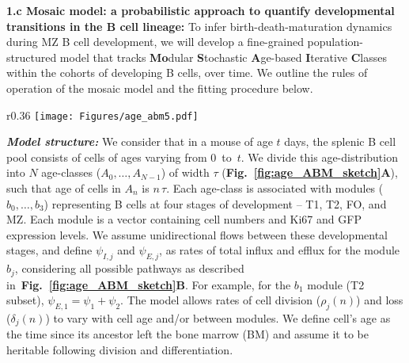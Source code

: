 \documentclass[11pt]{article}
\newcommand\ie{$\textit{i.e.}$}
\newcommand{\blue}[1]{{\color{blue}{#1}}}
\begin{document}
\textbf{{1.c Mosaic model: a probabilistic approach to quantify developmental transitions in the B cell lineage:}}
To infer birth-death-maturation dynamics during MZ B cell development, we will develop a fine-grained population-structured model that tracks \textbf{Mo}dular \textbf{S}tochastic \textbf{A}ge-based \textbf{I}terative \textbf{C}lasses within the cohorts of developing B cells, over time.
We outline the rules of operation of the mosaic model and the fitting procedure below.

\begin{wrapfigure}{r}{0.36\textwidth}
\centering
\vspace*{1mm}
\texttt{[image: Figures/age\_abm5.pdf]}
\vspace*{-6mm}
\caption{
\textbf{(A)}~Schematics of the mosaic model. %
\textbf{(B)}~Candidate pathways of B cell development.
}
\vspace*{-4mm}
\label{fig:age_ABM_sketch}
\end{wrapfigure}

\textbf{\textit{Model structure:}}
We consider that in a mouse of age $t$ days, the splenic B cell pool consists of cells of ages varying from $0$~to~$t$.
We divide this age-distribution into $N$ age-classes ($A_{0} ,\ldots, A_{N-1}$)  of width $\tau$ (\textbf{Fig.~\ref{fig:age_ABM_sketch}A}), such that age of cells in $A_{n}$ is $n \, \tau$. %
Each age-class is associated with modules ($b_{0} ,\ldots, b_{3}$) representing B cells at four stages of development -- T1, T2, FO, and MZ. Each module is a vector containing cell numbers and Ki67 and GFP expression levels. %
We assume unidirectional flows between these developmental stages, and define $\psi_{I, j}$ and $\psi_{E, j}$, as rates of total influx and efflux for the module $b_j$, considering all possible pathways as described in~\textbf{Fig.~\ref{fig:age_ABM_sketch}B}.
For example, for the $b_1$ module (T2 subset), $\psi_{E, 1} = \psi_1 + \psi_2$.
The model allows rates of cell division ($\rho_{j}(n)$) and loss ($\delta_{j}(n)$) to vary with cell age and/or between modules. 
We define cell's age as the time since its ancestor left the bone marrow (BM) and assume it to be heritable following division and differentiation.
\end{document}
